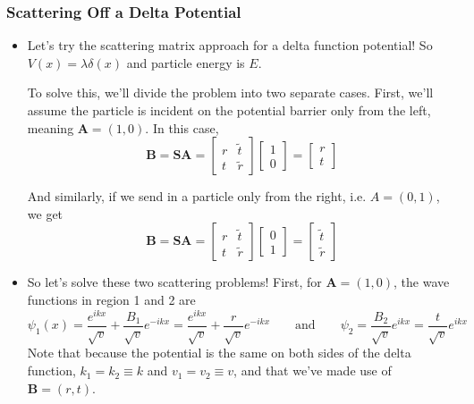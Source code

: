 \documentclass[11pt, a4paper]{article}
\newcommand{\eqtext}[1]{\qquad \text{#1} \qquad}
\renewcommand{\vec}[1]{\bm{#1}} %
\newcommand{\mat}[1]{\mathbf{#1}} %
\begin{document}
\subsubsection{Scattering Off a Delta Potential}
\begin{itemize}	
 	\item Let's try the scattering matrix approach for a delta function potential! So $ V(x) = \lambda \delta(x) $ and particle energy is $ E $. 
	
	To solve this, we'll divide the problem into two separate cases. First, we'll assume the particle is incident on the potential barrier only from the left, meaning $ \vec{A} = (1, 0) $. In this case,
	\begin{equation*}
		\vec{B} = \mat{S} \vec{A} = 
		\begin{bmatrix}
			r & \tilde{t}\\
			t & \tilde{r}
		\end{bmatrix}
		\begin{bmatrix}
			1\\
			0
		\end{bmatrix}
		= 
		\begin{bmatrix}
			r\\
			t
		\end{bmatrix}
	\end{equation*}
	
	And similarly, if we send in a particle only from the right, i.e. $ A = (0, 1) $, we get
	\begin{equation*}
		\vec{B} = \mat{S} \vec{A} = 
		\begin{bmatrix}
			r & \tilde{t}\\
			t & \tilde{r}
		\end{bmatrix}
		\begin{bmatrix}
			0\\
			1
		\end{bmatrix}
		= 
		\begin{bmatrix}
			\tilde{t}\\
			\tilde{r}
		\end{bmatrix}
	\end{equation*}
		
	\item So let's solve these two scattering problems! First, for $ \vec{A} = (1, 0) $, the wave functions in region 1 and 2 are
	\begin{equation*}
		\psi_{1}(x) = \frac{e^{ikx}}{\sqrt{v}} + \frac{B_{1}}{\sqrt{v}} e^{-ikx} = \frac{e^{ikx}}{\sqrt{v}} + \frac{r}{\sqrt{v}} e^{-ikx} \eqtext{and} \psi_{2} = \frac{B_{2}}{\sqrt{v}} e^{ikx} = \frac{t}{\sqrt{v}} e^{ikx}
	\end{equation*}
	Note that because the potential is the same on both sides of the delta function, $ k_{1} = k_{2} \equiv k$ and $ v_{1} = v_{2} \equiv v $, and that we've made use of $ \vec{B} = (r, t) $. 
	

\end{itemize}
\end{document}
